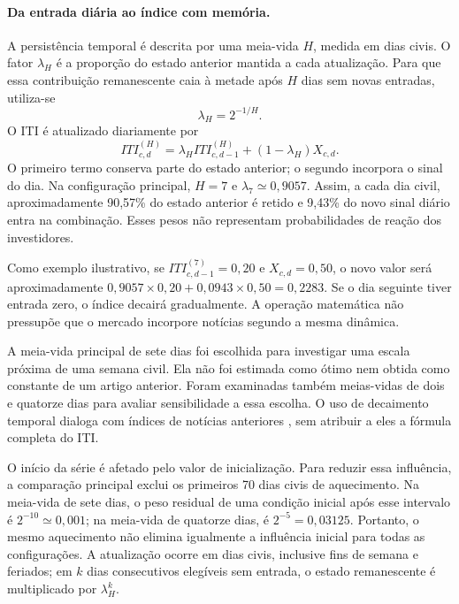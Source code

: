 \paragraph{Da entrada diária ao índice com memória.}
A persistência temporal é descrita por uma meia-vida $H$, medida em dias civis. O fator $\lambda_H$ é a proporção do estado anterior mantida a cada atualização. Para que essa contribuição remanescente caia à metade após $H$ dias sem novas entradas, utiliza-se
\begin{equation}
    \lambda_H=2^{-1/H}.
    \label{eq:iti-lambda}
\end{equation}
O ITI é atualizado diariamente por
\begin{equation}
    ITI_{c,d}^{(H)}=\lambda_H ITI_{c,d-1}^{(H)}+(1-\lambda_H)X_{c,d}.
    \label{eq:iti-recorrencia}
\end{equation}
O primeiro termo conserva parte do estado anterior; o segundo incorpora o sinal do dia. Na configuração principal, $H=7$ e $\lambda_7\simeq0{,}9057$. Assim, a cada dia civil, aproximadamente 90,57\% do estado anterior é retido e 9,43\% do novo sinal diário entra na combinação. Esses pesos não representam probabilidades de reação dos investidores.

Como exemplo ilustrativo, se $ITI_{c,d-1}^{(7)}=0{,}20$ e $X_{c,d}=0{,}50$, o novo valor será aproximadamente $0{,}9057\times0{,}20+0{,}0943\times0{,}50=0{,}2283$. Se o dia seguinte tiver entrada zero, o índice decairá gradualmente. A operação matemática não pressupõe que o mercado incorpore notícias segundo a mesma dinâmica.

A meia-vida principal de sete dias foi escolhida para investigar uma escala próxima de uma semana civil. Ela não foi estimada como ótimo nem obtida como constante de um artigo anterior. Foram examinadas também meias-vidas de dois e quatorze dias para avaliar sensibilidade a essa escolha. O uso de decaimento temporal dialoga com índices de notícias anteriores \cite{shapiro2022fed,buckman2020dnsi,frbsfNewsSentiment}, sem atribuir a eles a fórmula completa do ITI.

O início da série é afetado pelo valor de inicialização. Para reduzir essa influência, a comparação principal exclui os primeiros 70 dias civis de aquecimento. Na meia-vida de sete dias, o peso residual de uma condição inicial após esse intervalo é $2^{-10}\simeq0{,}001$; na meia-vida de quatorze dias, é $2^{-5}=0{,}03125$. Portanto, o mesmo aquecimento não elimina igualmente a influência inicial para todas as configurações. A atualização ocorre em dias civis, inclusive fins de semana e feriados; em $k$ dias consecutivos elegíveis sem entrada, o estado remanescente é multiplicado por $\lambda_H^k$.

